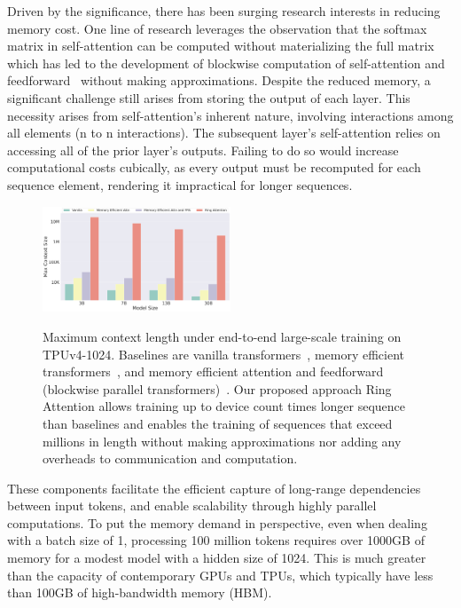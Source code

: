 \documentclass{article}
\newcommand{\ours}{{Ring Attention}\xspace}
\begin{document}
Driven by the significance, there has been surging research interests in reducing memory cost. One line of research leverages the observation that the softmax matrix in self-attention can be computed without materializing the full matrix~\citep{milakov2018online} which has led to the development of blockwise computation of self-attention and feedforward~\citep{rabe2021self, dao2022flashattention, liu2023blockwise} without making approximations.
Despite the reduced memory, a significant challenge still arises from storing the output of each layer.
This necessity arises from self-attention's inherent nature, involving interactions among all elements (n to n interactions). The subsequent layer's self-attention relies on accessing all of the prior layer's outputs. Failing to do so would increase computational costs cubically, as every output must be recomputed for each sequence element, rendering it impractical for longer sequences.
\begin{figure}
\centering
\includegraphics[width=0.5\textwidth]{figures/context_len.png}
\label{fig:bar_preview}
\vspace{-1.85em}
\caption{
Maximum context length under end-to-end large-scale training on TPUv4-1024.
Baselines are vanilla transformers~\citep{vaswani2017attention}, memory efficient transformers~\citep{rabe2021self}, and memory efficient attention and feedforward (blockwise parallel transformers)~\citep{liu2023blockwise}.
Our proposed approach \ours allows training up to device count times longer sequence than baselines and enables the training of sequences that exceed millions in length without making approximations nor adding any overheads to communication and computation.
}
\vspace{-1.3em}
\end{figure}
These components facilitate the efficient capture of long-range dependencies between input tokens, and enable scalability through highly parallel computations.
To put the memory demand in perspective, even when dealing with a batch size of 1, processing 100 million tokens requires over 1000GB of memory for a modest model with a hidden size of 1024. This is much greater than the capacity of contemporary GPUs and TPUs, which typically have less than 100GB of high-bandwidth memory (HBM).
\end{document}
